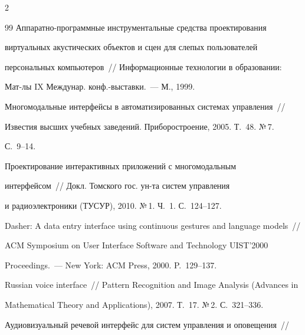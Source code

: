 \begin{multicols}{2}
{{\begin{thebibliography}{99}
Ап\-па\-рат\-но-программные инструментальные средства проектирования 


виртуальных акустических объектов и сцен для слепых пользователей 


персональных компьютеров~// Информационные технологии в образовании: 


Мат-лы IX Междунар. конф.-выс\-тав\-ки.~--- М., 1999.






Многомодальные интерфейсы в автоматизированных системах управления~// 


Известия высших учебных заведений. Приборостроение, 2005. Т.~48. №\,7. 


С.~9--14.









Проектирование интерактивных приложений с многомодальным 


интерфейсом~// Докл. Томского гос. ун-та сис\-тем управ\-ле\-ния 


и радиоэлектроники (ТУСУР), 2010. №\,1. Ч.~1. С.~124--127.









Dasher: A data entry interface using continuous gestures and language models~// 


ACM Symposium on User Interface Software and Technology UIST'2000 


Proceedings.~--- New York: ACM Press, 2000. P.~129--137.









Russian voice interface~// Pattern Recognition and Image Analysis (Advances in 


Mathematical Theory and Applications), 2007. Т.~17. №\,2. С.~321--336.









Аудиовизуальный речевой интерфейс для систем управления и оповещения~// 



\end{thebibliography}}}
\end{multicols}

